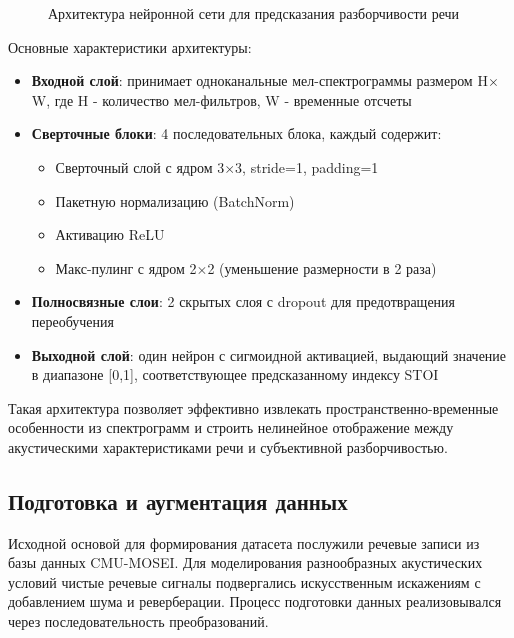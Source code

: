 \documentclass[oneside, final, 14pt]{extarticle}
\begin{document}
\begin{figure}[]
\caption{Архитектура нейронной сети для предсказания разборчивости речи}
\label{fig:nn_architecture}
\end{figure}

Основные характеристики архитектуры:
\begin{itemize}
    \item \textbf{Входной слой}: принимает одноканальные мел-спектрограммы размером H$\times$W, где H - количество мел-фильтров, W - временные отсчеты
    \item \textbf{Сверточные блоки}: 4 последовательных блока, каждый содержит:
    \begin{itemize}
        \item Сверточный слой с ядром 3$\times$3, stride=1, padding=1
        \item Пакетную нормализацию (BatchNorm)
        \item Активацию ReLU
        \item Макс-пулинг с ядром 2$\times$2 (уменьшение размерности в 2 раза)
    \end{itemize}
    \item \textbf{Полносвязные слои}: 2 скрытых слоя с dropout для предотвращения переобучения
    \item \textbf{Выходной слой}: один нейрон с сигмоидной активацией, выдающий значение в диапазоне [0,1], соответствующее предсказанному индексу STOI
\end{itemize}

Такая архитектура позволяет эффективно извлекать пространственно-временные особенности из спектрограмм и строить нелинейное отображение между акустическими характеристиками речи и субъективной разборчивостью.

\subsection{Подготовка и аугментация данных}

Исходной основой для формирования датасета послужили речевые записи из базы данных CMU-MOSEI. Для моделирования разнообразных акустических условий чистые речевые сигналы подвергались искусственным искажениям с добавлением шума и реверберации. Процесс подготовки данных реализовывался через последовательность преобразований.
\end{document}
